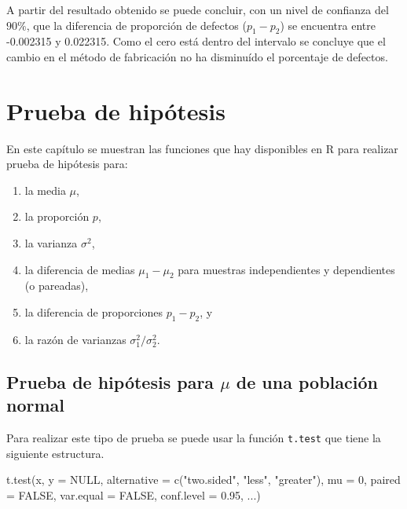 \documentclass[
]{book}
\makeatletter
\newenvironment{Shaded}{\begin{snugshade}}{\end{snugshade}}
\newcommand{\AttributeTok}[1]{\textcolor[rgb]{0.77,0.63,0.00}{#1}}
\newcommand{\ConstantTok}[1]{\textcolor[rgb]{0.00,0.00,0.00}{#1}}
\newcommand{\DecValTok}[1]{\textcolor[rgb]{0.00,0.00,0.81}{#1}}
\newcommand{\FloatTok}[1]{\textcolor[rgb]{0.00,0.00,0.81}{#1}}
\newcommand{\FunctionTok}[1]{\textcolor[rgb]{0.00,0.00,0.00}{#1}}
\newcommand{\NormalTok}[1]{#1}
\newcommand{\StringTok}[1]{\textcolor[rgb]{0.31,0.60,0.02}{#1}}
\providecommand{\tightlist}{%
  \setlength{\itemsep}{0pt}\setlength{\parskip}{0pt}}
\newenvironment{kframe}{%
\medskip{}
\setlength{\fboxsep}{.8em}
 \def\at@end@of@kframe{}%
 \ifinner\ifhmode%
  \def\at@end@of@kframe{\end{minipage}}%
  \begin{minipage}{\columnwidth}%
 \fi\fi%
 \def\FrameCommand##1{\hskip\@totalleftmargin \hskip-\fboxsep
 \colorbox{shadecolor}{##1}\hskip-\fboxsep
     \hskip-\linewidth \hskip-\@totalleftmargin \hskip\columnwidth}%
 \MakeFramed {\advance\hsize-\width
   \@totalleftmargin\z@ \linewidth\hsize
   \@setminipage}}%
 {\par\unskip\endMakeFramed%
 \at@end@of@kframe}
\renewenvironment{Shaded}{\begin{kframe}}{\end{kframe}}
\makeatother
\begin{document}
A partir del resultado obtenido se puede concluir, con un nivel de confianza del \(90\%\), que la diferencia de proporción de defectos (\(p_1 - p_2\)) se encuentra entre -0.002315 y 0.022315. Como el cero está dentro del intervalo se concluye que el cambio en el método de fabricación no ha disminuído el porcentaje de defectos.

\hypertarget{ph}{%
\chapter{Prueba de hipótesis}\label{ph}}

En este capítulo se muestran las funciones que hay disponibles en R para realizar prueba de hipótesis para:

\begin{enumerate}
\def\labelenumi{\arabic{enumi}.}
\tightlist
\item
  la media \(\mu\),
\item
  la proporción \(p\),
\item
  la varianza \(\sigma^2\),
\item
  la diferencia de medias \(\mu_1-\mu_2\) para muestras independientes y dependientes (o pareadas),
\item
  la diferencia de proporciones \(p_1 - p_2\), y
\item
  la razón de varianzas \(\sigma_1^2 / \sigma_2^2\).
\end{enumerate}

\hypertarget{prueba-de-hipuxf3tesis-para-mu-de-una-poblaciuxf3n-normal}{%
\section{\texorpdfstring{Prueba de hipótesis para \(\mu\) de una población normal}{Prueba de hipótesis para \textbackslash mu de una población normal}}\label{prueba-de-hipuxf3tesis-para-mu-de-una-poblaciuxf3n-normal}}

Para realizar este tipo de prueba se puede usar la función \texttt{t.test} que tiene la siguiente estructura.

\begin{Shaded}
\begin{Highlighting}[]
\FunctionTok{t.test}\NormalTok{(x, }\AttributeTok{y =} \ConstantTok{NULL}\NormalTok{,}
       \AttributeTok{alternative =} \FunctionTok{c}\NormalTok{(}\StringTok{"two.sided"}\NormalTok{, }\StringTok{"less"}\NormalTok{, }\StringTok{"greater"}\NormalTok{),}
       \AttributeTok{mu =} \DecValTok{0}\NormalTok{, }\AttributeTok{paired =} \ConstantTok{FALSE}\NormalTok{, }\AttributeTok{var.equal =} \ConstantTok{FALSE}\NormalTok{,}
       \AttributeTok{conf.level =} \FloatTok{0.95}\NormalTok{, ...)}
\end{Highlighting}
\end{Shaded}
\end{document}
